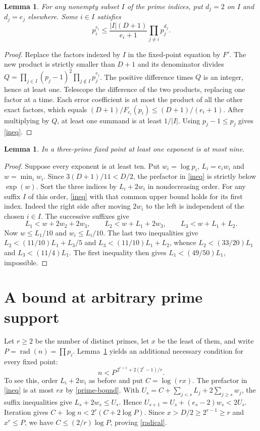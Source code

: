 \documentclass[11pt]{article}
\newtheorem{lemma}[theorem]{Lemma}
\begin{document}
\begin{lemma}\label{subsets}
For any nonempty subset $I$ of the prime indices, put $d_j=2$ on $I$ and $d_j=e_j$ elsewhere. Some $i\in I$ satisfies
\begin{equation}
 p_i^{e_i}\le \frac{|I|(D+1)}{e_i+1}\prod_{j\ne i}p_j^{d_j}.\label{ineq}
\end{equation}
\end{lemma}
\begin{proof}
Replace the factors indexed by $I$ in the fixed-point equation by $F'$. The new product is strictly smaller than $D+1$ and its denominator divides $Q=\prod_{j\in I}(p_j-1)^2\prod_{j\notin I}p_j^{e_j}$. The positive difference times $Q$ is an integer, hence at least one. Telescope the difference of the two products, replacing one factor at a time. Each error coefficient is at most the product of all the other exact factors, which equals $(D+1)/F_{e_i}(p_i)\le(D+1)/(e_i+1)$. After multiplying by $Q$, at least one summand is at least $1/|I|$. Using $p_j-1\le p_j$ gives \eqref{ineq}.
\end{proof}

\begin{lemma}\label{ten}
In a three-prime fixed point at least one exponent is at most nine.
\end{lemma}
\begin{proof}
Suppose every exponent is at least ten. Put $w_i=\log p_i$, $L_i=e_iw_i$ and $w=\min_iw_i$. Since $3(D+1)/11<D/2$, the prefactor in \eqref{ineq} is strictly below $\exp(w)$. Sort the three indices by $L_i+2w_i$ in nondecreasing order. For any suffix $I$ of this order, \eqref{ineq} with that common upper bound holds for its first index. Indeed the right side after moving $2w_i$ to the left is independent of the chosen $i\in I$. The successive suffixes give
\[
 L_1<w+2w_2+2w_3,\qquad L_2<w+L_1+2w_3,\qquad L_3<w+L_1+L_2.
\]
Now $w\le L_1/10$ and $w_i\le L_i/10$. The last two inequalities give $L_2<(11/10)L_1+L_3/5$ and $L_3<(11/10)L_1+L_2$, whence $L_2<(33/20)L_1$ and $L_3<(11/4)L_1$. The first inequality then gives $L_1<(49/50)L_1$, impossible.
\end{proof}

\section{A bound at arbitrary prime support}
Let $r\ge2$ be the number of distinct primes, let $x$ be the least of them, and write $P=\operatorname{rad}(n)=\prod p_i$. Lemma~\ref{subsets} yields an additional necessary condition for every fixed point:
\begin{equation}
 n<P^{\,2^{r+1}+2(2^r-1)/r}.\label{radical}
\end{equation}
To see this, order $L_i+2w_i$ as before and put $C=\log(rx)$. The prefactor in \eqref{ineq} is at most $rx$ by \eqref{prime-bound}. With $U_s=C+\sum_{j<s}L_j+2\sum_{j\ge s}w_j$, the suffix inequalities give $L_s+2w_s\le U_s$. Hence $U_{s+1}=U_s+(e_s-2)w_s<2U_s$. Iteration gives $C+\log n<2^r(C+2\log P)$. Since $x>D/2\ge2^{r-1}\ge r$ and $x^r\le P$, we have $C\le(2/r)\log P$, proving \eqref{radical}.
\end{document}
